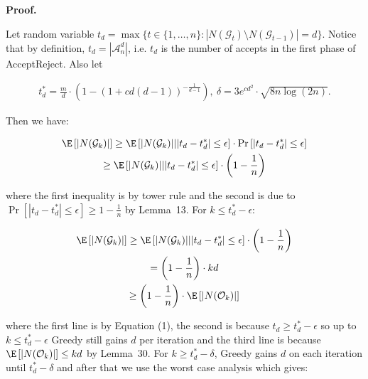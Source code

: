 \documentclass[10pt,a4paper]{article}
\begin{document}



\par\medskip\noindent\textbf{Proof.}\par



Let random variable $t_{d}=\max\{t\in\{1,\dots,n\}:|N(\mathcal{G}_{t})\setminus N(\mathcal{G}_{t-1})|=d\}$.
Notice that by definition, $t_{d}=|\mathcal{A}^{d}_{n}|$, i.e. $t_{d}$ is the number of accepts in the first phase of AcceptReject.
Also let\par


\[\begin{gathered}
\displaystyle t^{*}_{d}=\frac{m}{d}\cdot\left(1-\left(1+cd(d-1)\right)^{-\frac{1}{d-1}}\right),\ \delta=3e^{cd^{2}}\cdot\sqrt{8n\log(2n)}.
\end{gathered}\]


Then we have:\par


\[\begin{gathered}
\displaystyle\E\left[|N(\mathcal{G}_{k})|\right] \displaystyle\geq\E\left[|N(\mathcal{G}_{k})|\middle||t_{d}-t^{*}_{d}|\leq\epsilon\right]\cdot\Pr\left[|t_{d}-t^{*}_{d}|\leq\epsilon\right] \\
\displaystyle\geq\E\left[|N(\mathcal{G}_{k})|\middle||t_{d}-t^{*}_{d}|\leq\epsilon\right]\cdot\left(1-\frac{1}{n}\right)
\end{gathered}\]


where the first inequality is by tower rule and the second is due to $\Pr\left[|t_{d}-t^{*}_{d}|\leq\epsilon\right]\geq 1-\frac{1}{n}$ by Lemma 13.
For $k\leq t^{*}_{d}-\epsilon$:\par


\[\begin{gathered}
\displaystyle\E\left[|N(\mathcal{G}_{k})|\right] \displaystyle\geq\E\left[|N(\mathcal{G}_{k})|\middle||t_{d}-t^{*}_{d}|\leq\epsilon\right]\cdot\left(1-\frac{1}{n}\right) \\
\displaystyle=\left(1-\frac{1}{n}\right)\cdot kd \\
\displaystyle\geq\left(1-\frac{1}{n}\right)\cdot\E\left[|N(\mathcal{O}_{k})|\right]
\end{gathered}\]


where the first line is by Equation (1), the second is because $t_{d}\geq t^{*}_{d}-\epsilon$ so up to $k\leq t^{*}_{d}-\epsilon$ Greedy still gains $d$ per iteration and the third line is because $\E\left[|N(\mathcal{O}_{k})|\right]\leq kd$ by Lemma 30.
For $k\geq t^{*}_{d}-\delta$, Greedy gains $d$ on each iteration until $t^{*}_{d}-\delta$ and after that we use the worst case analysis which gives:\par
\end{document}
